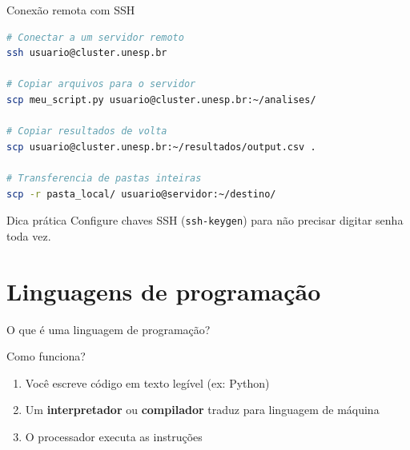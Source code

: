 \begin{frame}[fragile, shrink=15]{Conexão remota com SSH}

\begin{lstlisting}[language=bash, basicstyle=\ttfamily\footnotesize]
# Conectar a um servidor remoto
ssh usuario@cluster.unesp.br

# Copiar arquivos para o servidor
scp meu_script.py usuario@cluster.unesp.br:~/analises/

# Copiar resultados de volta
scp usuario@cluster.unesp.br:~/resultados/output.csv .

# Transferencia de pastas inteiras
scp -r pasta_local/ usuario@servidor:~/destino/
\end{lstlisting}

\vspace{0.2cm}
\begin{exampleblock}{Dica prática}
Configure chaves SSH (\texttt{ssh-keygen}) para não precisar digitar senha toda vez.
\end{exampleblock}
\end{frame}

\section{Linguagens de programação}

\begin{frame}[shrink=15]{O que é uma linguagem de programação?}

\vspace{0.3cm}

\begin{block}{Como funciona?}
\begin{enumerate}
    \item Você escreve código em texto legível (ex: Python)
    \item Um \textbf{interpretador} ou \textbf{compilador} traduz para linguagem de máquina
    \item O processador executa as instruções
\end{enumerate}
\end{block}

\vspace{0.2cm}
\end{frame}

